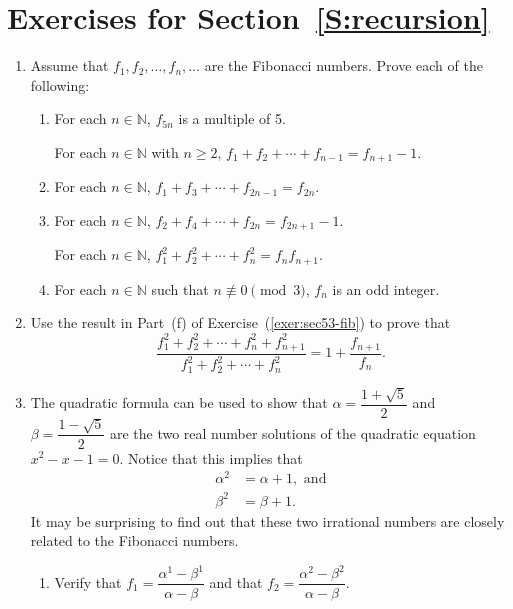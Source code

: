 \section*{Exercises for Section~\ref{S:recursion}}
%
\begin{enumerate}
\xitem For the sequence   $a_{0}, a_1 ,a_2 , \ldots , a_n , \ldots $ , assume that  $a_0  = 1$
and that for each  $n \in \mathbb{N} \cup \left\{ 0 \right\}$,  $a_{n + 1}  = \left( {n + 1} \right)a_n $.  Use mathematical induction to prove that  for each  $n \in \mathbb{N} \cup \left\{ 0 \right\}$,  $a_n  = n!$.
\label{exer:sec51-factorial}%



\item Assume that   $f_1 ,f_2 , \ldots ,f_n , \ldots $ are the Fibonacci numbers.  Prove each of the following: \label{exer:sec53-fib}

\begin{enumerate}
  \yitem For each  $n \in \mathbb{N}$,  $f_{4n} $  is a multiple of  3.

  \item For each  $n \in \mathbb{N}$,  $f_{5n} $  is a multiple of  5.

  \yitem For each  $n \in \mathbb{N}$ with  $n \geq 2$,  $f_1  + f_2  +  \cdots  + f_{n - 1}  = 
                   f_{n + 1}  - 1$.

  \item For each  $n \in \mathbb{N}$,  $f_1  + f_3  +  \cdots  + f_{2n - 1}  = f_{2n} $.

  \item For each  $n \in \mathbb{N}$,  $f_2  + f_4  +  \cdots  + f_{2n}  = f_{2n + 1}  - 1$.

  \yitem For each  $n \in \mathbb{N}$,  $f_1^2  + f_2^2  +  \cdots  + f_n^2  = f_n f_{n + 1} $.

  \item For each  $n \in \mathbb{N}$ such that  $n\not  \equiv 0 \pmod 3$,  $f_n $ is an odd integer.
\end{enumerate}


\item Use the result in Part~(f) of Exercise~(\ref{exer:sec53-fib}) to prove that
\[
\frac{f_1^2  + f_2^2  +  \cdots  + f_n^2 + f_{n+1}^2}{f_1^2  + f_2^2  +  \cdots  + f_n^2} 
     = 1 + \frac{f_{n+1}}{f_n}.
\]


\item \label{exer:binet} The quadratic formula can be used to show that  $\alpha = \dfrac{1 + \sqrt{5}}{2}$ and 
\mbox{$\beta = \dfrac{1 - \sqrt{5}}{2}$} are the two real number solutions of the quadratic equation 
$x^2 - x - 1 = 0$.  Notice that this implies that
\begin{align*}
\alpha^2 &= \alpha + 1, \text{ and} \\
\beta^2 &= \beta + 1.
\end{align*}
It may be surprising to find out that these two irrational numbers are closely related to the Fibonacci numbers.  
\begin{enumerate}
  \item Verify that $f_1 = \dfrac{\alpha^1 - \beta^1}{\alpha - \beta}$ and that 
$f_2 = \dfrac{\alpha^2 - \beta^2}{\alpha - \beta}$.


\end{enumerate}
\end{enumerate}
